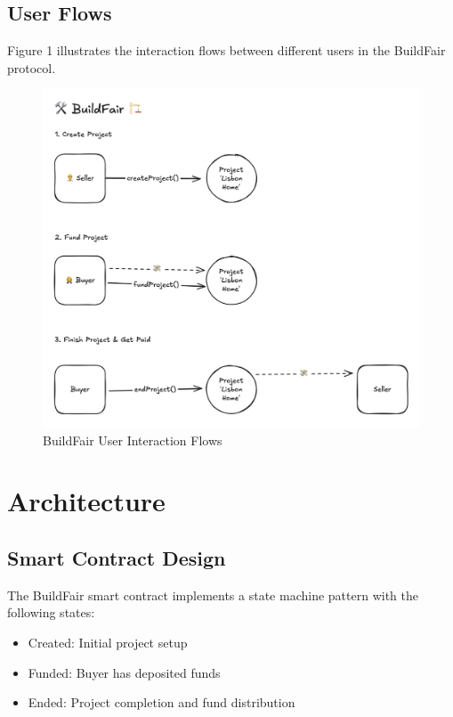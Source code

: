 \documentclass[12pt]{article}
\begin{document}
\subsection{User Flows}
Figure 1 illustrates the interaction flows between different users in the BuildFair protocol.

\begin{figure}[h]
    \centering
    \includegraphics[width=\textwidth]{../buildfair-app/public/userflows.png}
    \caption{BuildFair User Interaction Flows}
    \label{fig:userflows}
\end{figure}

\section{Architecture}
\subsection{Smart Contract Design}
The BuildFair smart contract implements a state machine pattern with the following states:
\begin{itemize}
    \item Created: Initial project setup
    \item Funded: Buyer has deposited funds
    \item Ended: Project completion and fund distribution
\end{itemize}
\end{document}
